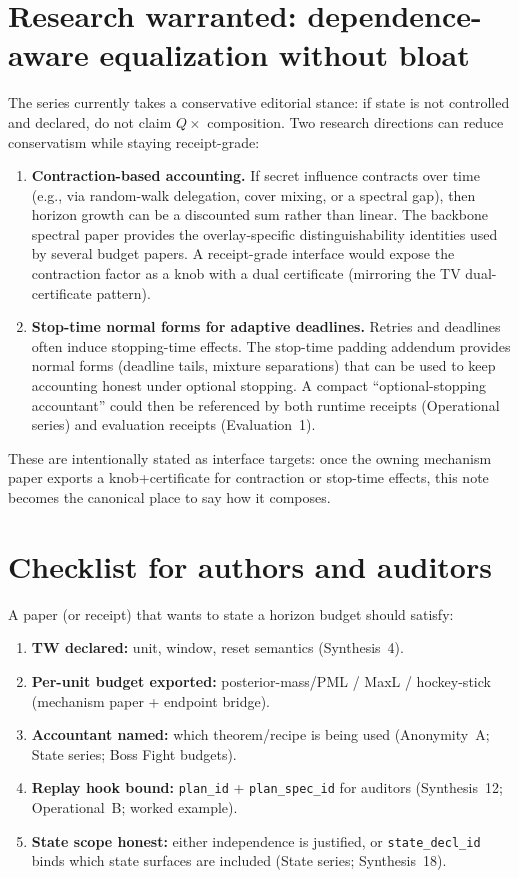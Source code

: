 \documentclass[11pt]{article}
\begin{document}
\section{Research warranted: dependence-aware equalization without bloat}
The series currently takes a conservative editorial stance: if state is not controlled and declared, do not claim $Q\times$ composition.
Two research directions can reduce conservatism while staying receipt-grade:
\begin{enumerate}[leftmargin=*]
\item \textbf{Contraction-based accounting.}
If secret influence contracts over time (e.g., via random-walk delegation, cover mixing, or a spectral gap), then horizon growth can be a discounted sum rather than linear.
The backbone spectral paper provides the overlay-specific distinguishability identities used by several budget papers.\cite{series:spectral}
A receipt-grade interface would expose the contraction factor as a knob with a dual certificate (mirroring the TV dual-certificate pattern).\cite{series:knapsacktransport}
\item \textbf{Stop-time normal forms for adaptive deadlines.}
Retries and deadlines often induce stopping-time effects.
The stop-time padding addendum provides normal forms (deadline tails, mixture separations) that can be used to keep accounting honest under optional stopping.\cite{series:stoptimeaddendum}
A compact ``optional-stopping accountant'' could then be referenced by both runtime receipts (Operational series) and evaluation receipts (Evaluation~1).
\end{enumerate}
These are intentionally stated as interface targets: once the owning mechanism paper exports a knob+certificate for contraction or stop-time effects, this note becomes the canonical place to say how it composes.

\section{Checklist for authors and auditors}
A paper (or receipt) that wants to state a horizon budget should satisfy:
\begin{enumerate}[leftmargin=*]
\item \textbf{TW declared:} unit, window, reset semantics (Synthesis~4).
\item \textbf{Per-unit budget exported:} posterior-mass/PML / MaxL / hockey-stick (mechanism paper + endpoint bridge).
\item \textbf{Accountant named:} which theorem/recipe is being used (Anonymity~A; State series; Boss Fight budgets).
\item \textbf{Replay hook bound:} \texttt{plan\_id} + \texttt{plan\_spec\_id} for auditors (Synthesis~12; Operational~B; worked example).
\item \textbf{State scope honest:} either independence is justified, or \texttt{state\_decl\_id} binds which state surfaces are included (State series; Synthesis~18).
\end{enumerate}
\end{document}
